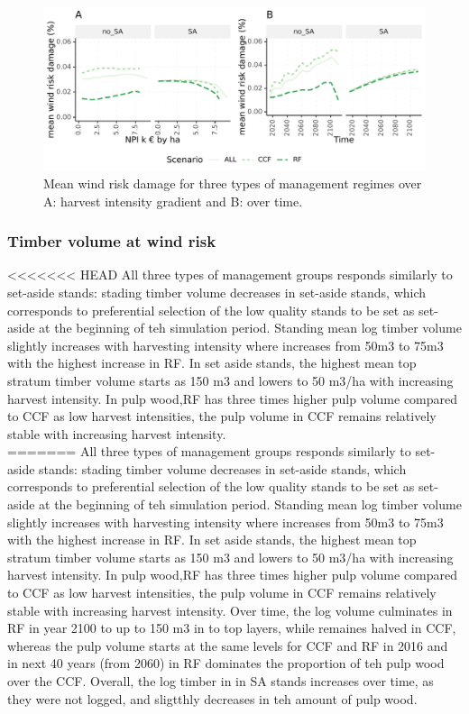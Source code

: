 \documentclass[]{elsarticle} %
\makeatletter
\def\maxwidth{\ifdim\Gin@nat@width>\linewidth\linewidth
\else\Gin@nat@width\fi}
\let\Oldincludegraphics\includegraphics
\renewcommand{\includegraphics}[1]{\Oldincludegraphics[width=\maxwidth]{#1}}
\makeatother
\begin{document}
\begin{figure}
\centering
\includegraphics{test_manus_files/figure-latex/fig_meanRisk_time_NPI-1.pdf}
\caption{\label{fig:fig_meanRisk_time_NPI} Mean wind risk damage for
three types of management regimes over A: harvest intensity gradient and
B: over time.}
\end{figure}

\hypertarget{timber-volume-at-wind-risk}{%
\subsubsection{Timber volume at wind
risk}\label{timber-volume-at-wind-risk}}

\textless{}\textless{}\textless{}\textless{}\textless{}\textless{}\textless{}
HEAD All three types of management groups responds similarly to
set-aside stands: stading timber volume decreases in set-aside stands,
which corresponds to preferential selection of the low quality stands to
be set as set-aside at the beginning of teh simulation period. Standing
mean log timber volume slightly increases with harvesting intensity
where increases from 50m3 to 75m3 with the highest increase in RF. In
set aside stands, the highest mean top stratum timber volume starts as
150 m3 and lowers to 50 m3/ha with increasing harvest intensity. In pulp
wood,RF has three times higher pulp volume compared to CCF as low
harvest intensities, the pulp volume in CCF remains relatively stable
with increasing harvest intensity.\\
======= All three types of management groups responds similarly to
set-aside stands: stading timber volume decreases in set-aside stands,
which corresponds to preferential selection of the low quality stands to
be set as set-aside at the beginning of teh simulation period. Standing
mean log timber volume slightly increases with harvesting intensity
where increases from 50m3 to 75m3 with the highest increase in RF. In
set aside stands, the highest mean top stratum timber volume starts as
150 m3 and lowers to 50 m3/ha with increasing harvest intensity. In pulp
wood,RF has three times higher pulp volume compared to CCF as low
harvest intensities, the pulp volume in CCF remains relatively stable
with increasing harvest intensity. Over time, the log volume culminates
in RF in year 2100 to up to 150 m3 in to top layers, while remaines
halved in CCF, whereas the pulp volume starts at the same levels for CCF
and RF in 2016 and in next 40 years (from 2060) in RF dominates the
proportion of teh pulp wood over the CCF. Overall, the log timber in in
SA stands increases over time, as they were not logged, and sligtthly
decreases in teh amount of pulp wood.
\end{document}
